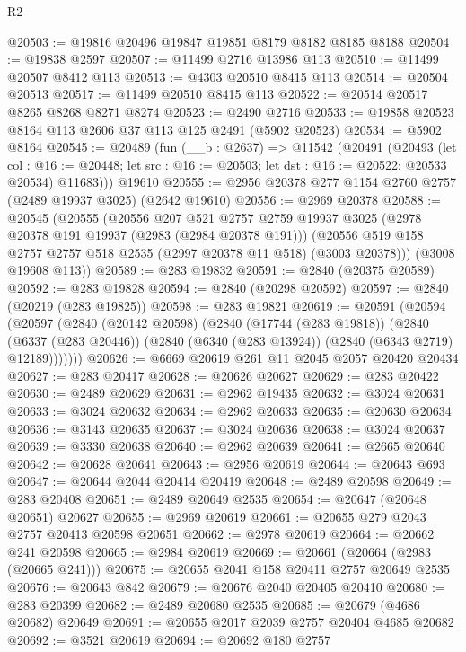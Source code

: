\begin{lexlean}{R2}
\begin{coremodule}
@20503 := @19816 @20496 @19847 @19851 @8179 @8182 @8185 @8188
@20504 := @19838 @2597
@20507 := @11499 @2716 @13986 @113
@20510 := @11499 @20507 @8412 @113
@20513 := @4303 @20510 @8415 @113
@20514 := @20504 @20513
@20517 := @11499 @20510 @8415 @113
@20522 := @20514 @20517 @8265 @8268 @8271 @8274
@20523 := @2490 @2716
@20533 := @19858 @20523 @8164 @113 @2606 @37 @113 @125 @2491 (@5902 @20523)
@20534 := @5902 @8164
@20545 := @20489
    (fun (__b : @2637) =>
    @11542
      (@20491
        (@20493
          (let col : @16 := @20448; let src : @16 := @20503; let dst : @16 := @20522; @20533 @20534)
          @11683)))
    @19610
@20555 := @2956 @20378 @277 @1154 @2760 @2757 (@2489 @19937 @3025) (@2642 @19610)
@20556 := @2969 @20378
@20588 := @20545
    (@20555
      (@20556
        @207
        @521
        @2757
        @2759
        @19937
        @3025
        (@2978 @20378 @191 @19937 (@2983 (@2984 @20378 @191)))
        (@20556 @519 @158 @2757 @2757 @518 @2535 (@2997 @20378 @11 @518) (@3003 @20378)))
      (@3008 @19608 @113))
@20589 := @283 @19832
@20591 := @2840 (@20375 @20589)
@20592 := @283 @19828
@20594 := @2840 (@20298 @20592)
@20597 := @2840 (@20219 (@283 @19825))
@20598 := @283 @19821
@20619 := @20591
    (@20594
      (@20597
        (@2840
          (@20142 @20598)
          (@2840
            (@17744 (@283 @19818))
            (@2840
              (@6337 (@283 @20446))
              (@2840 (@6340 (@283 @13924)) (@2840 (@6343 @2719) @12189)))))))
@20626 := @6669 @20619 @261 @11 @2045 @2057 @20420 @20434
@20627 := @283 @20417
@20628 := @20626 @20627
@20629 := @283 @20422
@20630 := @2489 @20629
@20631 := @2962 @19435
@20632 := @3024 @20631
@20633 := @3024 @20632
@20634 := @2962 @20633
@20635 := @20630 @20634
@20636 := @3143 @20635
@20637 := @3024 @20636
@20638 := @3024 @20637
@20639 := @3330 @20638
@20640 := @2962 @20639
@20641 := @2665 @20640
@20642 := @20628 @20641
@20643 := @2956 @20619
@20644 := @20643 @693
@20647 := @20644 @2044 @20414 @20419
@20648 := @2489 @20598
@20649 := @283 @20408
@20651 := @2489 @20649 @2535
@20654 := @20647 (@20648 @20651) @20627
@20655 := @2969 @20619
@20661 := @20655 @279 @2043 @2757 @20413 @20598 @20651
@20662 := @2978 @20619
@20664 := @20662 @241 @20598
@20665 := @2984 @20619
@20669 := @20661 (@20664 (@2983 (@20665 @241)))
@20675 := @20655 @2041 @158 @20411 @2757 @20649 @2535
@20676 := @20643 @842
@20679 := @20676 @2040 @20405 @20410
@20680 := @283 @20399
@20682 := @2489 @20680 @2535
@20685 := @20679 (@4686 @20682) @20649
@20691 := @20655 @2017 @2039 @2757 @20404 @4685 @20682
@20692 := @3521 @20619
@20694 := @20692 @180 @2757

\end{coremodule}
\end{lexlean}
